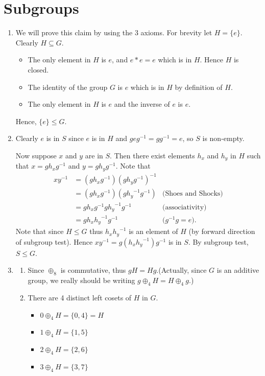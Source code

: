 \section{Subgroups}
\begin{enumerate}
    \item We will prove this claim by using the 3 axioms. For brevity let $H = \{e\}$. Clearly $H \subseteq G$.
    \begin{itemize}
        \item The only element in $H$ is $e$, and $e \ast e = e$ which is in $H$. Hence $H$ is closed.
        \item The identity of the group $G$ is $e$ which is in $H$ by definition of $H$.
        \item The only element in $H$ is $e$ and the inverse of $e$ is $e$.
    \end{itemize}
    Hence, $\{e\} \leq G$.

    \item Clearly $e$ is in $S$ since $e$ is in $H$ and $geg^{-1} = gg^{-1} = e$, so $S$ is non-empty.

    Now suppose $x$ and $y$ are in $S$. Then there exist elements $h_x$ and $h_y$ in $H$ such that $x = gh_xg^{-1}$ and $y = gh_yg^{-1}$. Note that
    \begin{align*}
        xy^{-1} &= (gh_xg^{-1})(gh_yg^{-1})^{-1}\\
        &= (gh_xg^{-1})(g{h_y}^{-1}g^{-1}) & \text{(Shoes and Shocks)}\\
        &= gh_xg^{-1}g{h_y}^{-1}g^{-1} & \text{(associativity)}\\
        &= gh_x{h_y}^{-1}g^{-1} & \text{(}g^{-1}g = e\text{)}.
    \end{align*}
    Note that since $H \leq G$ thus $h_x{h_y}^{-1}$ is an element of $H$ (by forward direction of subgroup test). Hence $xy^{-1} = g(h_x{h_y}^{-1})g^{-1}$ is in $S$. By subgroup test, $S \leq G$.

    \item \begin{enumerate}[label=(\alph*)]
        \item Since $\oplus_8$ is commutative, thus $gH = Hg$.\newline(Actually, since $G$ is an additive group, we really should be writing $g \oplus_4 H = H \oplus_4 g$.)
        \item There are 4 distinct left cosets of $H$ in $G$.
        \begin{itemize}
            \item $0 \oplus_4 H = \{0, 4\} = H$
            \item $1 \oplus_4 H = \{1, 5\}$
            \item $2 \oplus_4 H = \{2, 6\}$
            \item $3 \oplus_4 H = \{3, 7\}$
        \end{itemize}
    \end{enumerate}


\end{enumerate}
